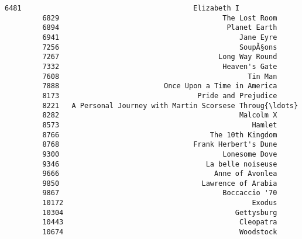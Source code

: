 \documentclass[11pt]{article}
\begin{document}
\begin{Verbatim}[commandchars=\\\{\}]
         6481                                         Elizabeth I   
         6829                                       The Lost Room   
         6894                                        Planet Earth   
         6941                                           Jane Eyre   
         7256                                           SoupÃ§ons   
         7267                                      Long Way Round   
         7332                                       Heaven's Gate   
         7608                                             Tin Man   
         7888                         Once Upon a Time in America   
         8173                                 Pride and Prejudice   
         8221   A Personal Journey with Martin Scorsese Throug{\ldots}   
         8282                                           Malcolm X   
         8573                                              Hamlet   
         8766                                    The 10th Kingdom   
         8768                                Frank Herbert's Dune   
         9300                                       Lonesome Dove   
         9346                                   La belle noiseuse   
         9666                                     Anne of Avonlea   
         9850                                  Lawrence of Arabia   
         9867                                       Boccaccio '70   
         10172                                             Exodus   
         10304                                         Gettysburg   
         10443                                          Cleopatra   
         10674                                          Woodstock   
         

\end{Verbatim}
\end{document}

